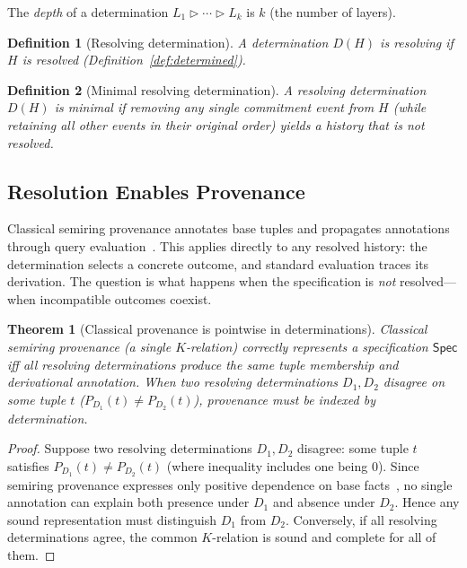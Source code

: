 \documentclass[acmsmall,review,anonymous]{acmart}
\newcommand{\Spec}{\mathsf{Spec}}
\newcommand{\seq}{\mathbin{\triangleright}}
\newtheorem{definition}{Definition}
\newtheorem{theorem}{Theorem}
\theoremstyle{remark}
\numberwithin{definition}{section}
\numberwithin{theorem}{section}
\numberwithin{lemma}{section}
\numberwithin{corollary}{section}
\numberwithin{remark}{section}
\numberwithin{example}{section}
\numberwithin{observation}{section}
\numberwithin{assumption}{section}
\begin{document}
\noindent
The \emph{depth} of a determination $L_1 \seq \cdots \seq L_k$ is $k$
(the number of layers).

\begin{definition}[Resolving determination]
  A determination $D(H)$ is \emph{resolving} if $H$ is resolved
  (Definition~\ref{def:determined}).
\end{definition}

\begin{definition}[Minimal resolving determination]
  \label{def:minimal-resolving}
  A resolving determination $D(H)$ is \emph{minimal} if removing any
  single commitment event from $H$ (while retaining all other events
  in their original order) yields a history that is not resolved.
\end{definition}

\subsection{Resolution Enables Provenance}
\label{sec:mono-theorem}

Classical semiring provenance annotates base tuples and propagates
annotations through query evaluation~\cite{green2007provenance}.
This applies directly to any resolved history: the determination
selects a concrete outcome, and standard evaluation traces its
derivation.
The question is what happens when the specification is \emph{not}
resolved---when incompatible outcomes coexist.

\begin{theorem}[Classical provenance is pointwise in determinations]
  \label{thm:resolution-implies-monotone}
  Classical semiring provenance (a single $K$-relation) correctly
  represents a specification $\Spec$ iff all resolving determinations
  produce the same tuple membership and derivational annotation.
  When two resolving determinations $D_1, D_2$ disagree on some tuple
  $t$ ($P_{D_1}(t) \neq P_{D_2}(t)$), provenance must be indexed by
  determination.
\end{theorem}

\begin{proof}
  Suppose two resolving determinations $D_1, D_2$ disagree: some tuple
  $t$ satisfies $P_{D_1}(t) \neq P_{D_2}(t)$ (where inequality
  includes one being $0$).
  Since semiring provenance expresses only positive dependence on base
  facts~\cite{green2007provenance}, no single annotation can
  explain both presence under $D_1$ and absence under $D_2$.
  Hence any sound representation must distinguish $D_1$ from $D_2$.
  Conversely, if all resolving determinations agree, the common
  $K$-relation is sound and complete for all of them.
\end{proof}
\end{document}
